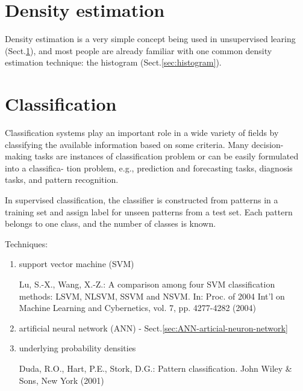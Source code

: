 
 
\section{Density estimation}
\label{sec:density-estimation}

Density estimation is a very simple concept being used in unsupervised learing
(Sect.\ref{sec:density-estimation}), and most people are already familiar with
one common density estimation technique: the histogram
(Sect.\ref{sec:histogram}).


\section{Classification}
\label{sec:classification}

Classification systems play an important role in a wide variety of fields by
classifying the available information based on some criteria.
Many decision-making tasks are instances of classification problem or can be
easily formulated into a classifica- tion problem, e.g., prediction and
forecasting tasks, diagnosis tasks, and pattern recognition.

In supervised classification, the classifier is constructed from patterns in a
training set and assign label for unseen patterns from a test set. Each pattern
belongs to one class, and the number of classes is known.

Techniques:
\begin{enumerate}
  \item support vector machine (SVM)

Lu, S.-X., Wang, X.-Z.: A comparison among four SVM classification methods:
LSVM, NLSVM, SSVM and NSVM. In: Proc. of 2004 Int'l on Machine Learning
and Cybernetics, vol. 7, pp. 4277-4282 (2004)

  
  \item artificial neural network (ANN) -
  Sect.\ref{sec:ANN-articial-neuron-network}
  
  \item underlying probability densities

Duda, R.O., Hart, P.E., Stork, D.G.: Pattern classification. John Wiley \& Sons,
New York (2001)

\end{enumerate}

